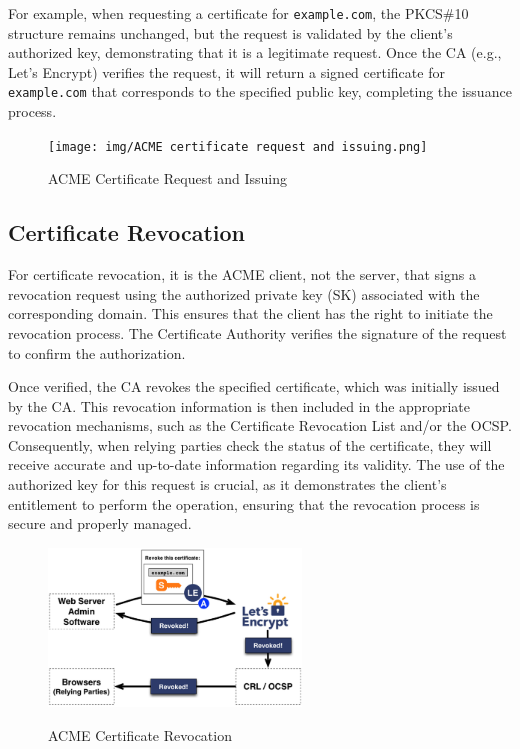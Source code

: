 For example, when requesting a certificate for \texttt{example.com},
the PKCS\#10 structure remains unchanged, but the request is validated
by the client’s authorized key, demonstrating that it is a legitimate
request. Once the CA (e.g., Let’s Encrypt) verifies the request, it
will return a signed certificate for \texttt{example.com} that
corresponds to the specified public key, completing the issuance
process.

\begin{figure}[H]
  \centering
  \texttt{[image: img/ACME certificate request
  and issuing.png]}
  \label{fig:acme cert}

  \caption{ACME Certificate Request and Issuing}
\end{figure}

\subsection{Certificate Revocation}

For certificate revocation, it is the ACME client, not the server,
that signs a revocation request using the authorized private key (SK)
associated with the corresponding domain. This ensures that the client
has the right to initiate the revocation process. The Certificate
Authority verifies the signature of the request to confirm the
authorization.

Once verified, the CA revokes the specified certificate, which was
initially issued by the CA. This revocation information is then
included in the appropriate revocation mechanisms, such as the
Certificate Revocation List and/or the OCSP. Consequently, when
relying parties check the status of the certificate, they will receive
accurate and up-to-date information regarding its validity. The use of
the authorized key for this request is crucial, as it demonstrates the
client's entitlement to perform the operation, ensuring that the
revocation process is secure and properly managed.

\begin{figure}[H]
  \centering
  \includegraphics[width=0.6\textwidth]{img/ACME certificate revocation.png}
  \label{fig:acme rev}

  \caption{ACME Certificate Revocation}
\end{figure}
